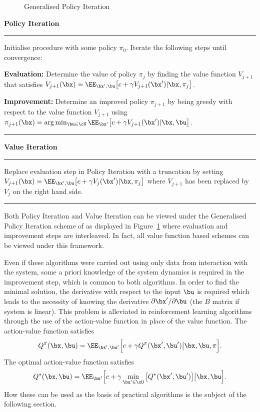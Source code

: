 \begin{figure}
\begin{center}

\end{center}
\caption{Generalised Policy Iteration}
\label{figs:GPI}
\end{figure}

\textbf{Policy Iteration} \\[-0.3cm]
\hrule
Initialise procedure with some policy $\pi_0$. Iterate the following steps until convergence: 

\textbf{Evaluation:} Determine the value of policy $\pi_j$ by finding the value function $V_{j+1}$ that satisfies $V_{j+1}(\bx) = \EE_{\bx',\bu} \big[c + \gamma V_{j+1}(\bx') |\bx,\pi_j \big]$.

\textbf{Improvement:} Determine an improved policy $\pi_{j+1}$ by being greedy with respect to the value function $V_{j+1}$ using $\pi_{j+1}(\bx) = \arg\min_{\bu\in\cU} \EE_{\bx'} \big[ c + \gamma V_{j+1}(\bx')|\bx,\bu\big]$. \\[-0.1cm]
\hrule

\vspace{0.2cm}
\textbf{Value Iteration} \\[-0.3cm]
\hrule
Replace evaluation step in Policy Iteration with a truncation by setting $V_{j+1}(\bx) = \EE_{\bx',\bu} \big[c + \gamma V_{j}(\bx') |\bx,\pi_j\big]$ where $V_{j+1}$ has been replaced by $V_j$ on the right hand side. \\[-0.1cm]
\hrule
\vspace{0.2cm}


Both Policy Iteration and Value Iteration can be viewed under the Generalised Policy Iteration scheme of \cite{SuBa98} as displayed in Figure~\ref{figs:GPI} where evaluation and improvement steps are interleaved. In fact, all value function based schemes can be viewed under this framework.



Even if these algorithms were carried out using only data from interaction with the system, some a priori knowledge of the system dynamics is required in the improvement step, which is common to both algorithms. In order to find the minimal solution, the derivative with respect to the input $\bu$ is required which leads to the necessity of knowing the derivative $\partial\bx'/\partial\bu$ (the $B$ matrix if system is linear). This problem is alleviated in reinforcement learning algorithms through the use of the action-value function in place of the value function. 
The action-value function satisfies
\begin{equation}
Q^\pi(\bx,\bu) = \EE_{\bx',\bu'} \Big[ c + \gamma Q^\pi(\bx',\bu') \big|\bx,\bu,\pi \Big]. \label{eqn:Qfixed}
\end{equation}
The optimal action-value function satisfies
\begin{equation}
Q^*(\bx,\bu) = \EE_{\bx'} \Big[ c + \gamma \min_{\bu'\in\cU}\big[Q^*(\bx',\bu')\big] \big|\bx,\bu \Big].
\end{equation}
How these can be used as the basis of practical algorithms is the subject of the following section.


